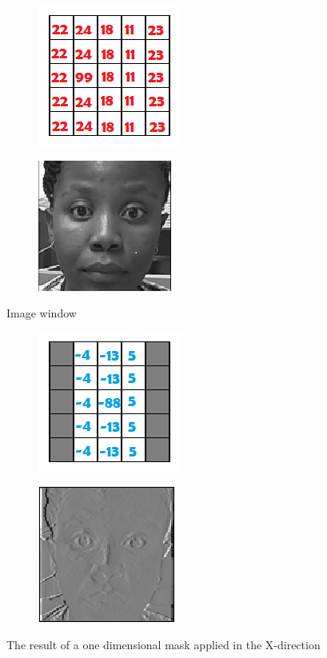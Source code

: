 \begin{figure}[H]
\centering
\begin{subfigure}{.5\textwidth}
  \centering
  \includegraphics[width=.4\linewidth]{im}
  \label{fig:sub1}
\end{subfigure}%
\begin{subfigure}{.5\textwidth}
  \centering
  \includegraphics[width=.4\linewidth]{roi}
  \label{fig:sub2}
\end{subfigure}
\caption{Image window}
\label{fig:test}
\end{figure}
\begin{figure}[H]
\centering
\begin{subfigure}{.5\textwidth}
  \centering
  \includegraphics[width=.4\linewidth]{gx}
  \label{fig:sub1}
\end{subfigure}%
\begin{subfigure}{.5\textwidth}
  \centering
  \includegraphics[width=.4\linewidth]{dx}
  \label{fig:sub2}
\end{subfigure}
\caption{The result of a one dimensional mask applied in the X-direction}
\label{fig:test}
\end{figure}
